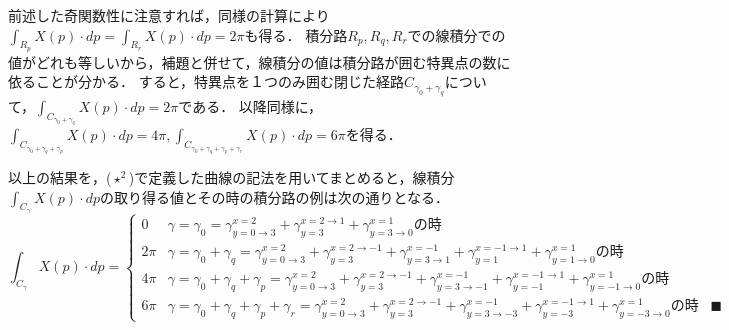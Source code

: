 \documentclass[dvipdfmx,a4paper,uplatex]{jsarticle}
\begin{document}
前述した奇関数性に注意すれば，同様の計算により$\int_{R_p}X(p)\cdot dp=\int_{R_r}X(p)\cdot dp=2\pi$も得る．
積分路$R_p,R_q,R_r$での線積分での値がどれも等しいから，補題と併せて，線積分の値は積分路が囲む特異点の数に依ることが分かる．
すると，特異点を１つのみ囲む閉じた経路$C_{\gamma_0+\gamma_q}$について，$\int_{C_{\gamma_0+\gamma_q}}X(p)\cdot dp=2\pi$である．
以降同様に，$\int_{C_{\gamma_0+\gamma_q+\gamma_p}}X(p)\cdot dp=4\pi, \int_{C_{\gamma_0+\gamma_q+\gamma_p+\gamma_r}}X(p)\cdot dp=6\pi$を得る．

以上の結果を，($\star^2$)で定義した曲線の記法を用いてまとめると，線積分$\int_{C_\gamma}X(p)\cdot dp$の取り得る値とその時の積分路の例は次の通りとなる．
\[
    \int_{C_\gamma}X(p)\cdot dp = 
    \begin{cases}
        0 & \gamma=\gamma_0=\gamma^{x=2}_{y=0\to 3}+\gamma^{x=2\to 1}_{y=3}+\gamma^{x=1}_{y=3\to 0}の時\\
        2\pi & \gamma=\gamma_0+\gamma_q=\gamma^{x=2}_{y=0\to 3}+\gamma^{x=2\to -1}_{y=3}+\gamma^{x=-1}_{y=3\to 1}+\gamma^{x=-1\to 1}_{y=1}+\gamma^{x=1}_{y=1\to 0}の時\\
        4\pi & \gamma=\gamma_0+\gamma_q+\gamma_p=\gamma^{x=2}_{y=0\to 3}+\gamma^{x=2\to -1}_{y=3}+\gamma^{x=-1}_{y=3\to -1}+\gamma^{x=-1\to 1}_{y=-1}+\gamma^{x=1}_{y=-1\to 0}の時\\
        6\pi & \gamma=\gamma_0+\gamma_q+\gamma_p+\gamma_r=\gamma^{x=2}_{y=0\to 3}+\gamma^{x=2\to -1}_{y=3}+\gamma^{x=-1}_{y=3\to -3}+\gamma^{x=-1\to 1}_{y=-3}+\gamma^{x=1}_{y=-3\to 0}の時\;\;\;\blacksquare
    \end{cases}
\]
\end{document}
